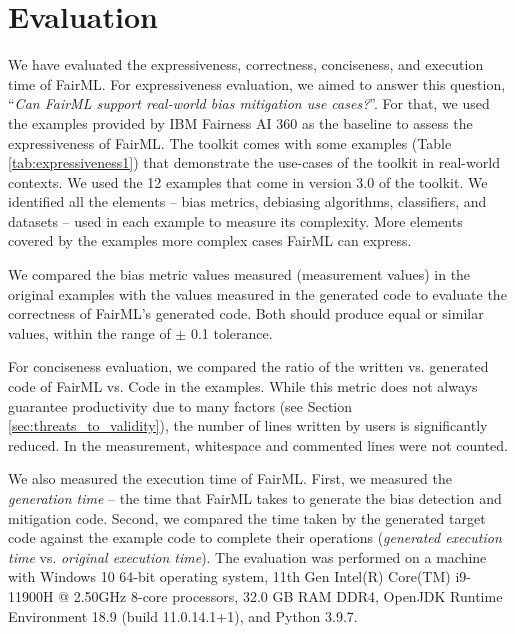 \documentclass[sigconf]{acmart}
\begin{document}
{	\section{Evaluation}
	\label{sec:evaluation}
	We have evaluated the expressiveness, correctness, conciseness, and execution time of FairML. For expressiveness evaluation, we aimed to answer this question, 
	``\textit{Can FairML support real-world bias mitigation use cases?}''. For that, we used the examples provided by IBM Fairness AI 360 as the baseline to assess the expressiveness of FairML. 
	The toolkit comes with some examples (Table \ref{tab:expressiveness1})
	that demonstrate 
	the use-cases of the toolkit in real-world contexts. 
	We used the 12 examples that come in version 3.0 of the toolkit.
	We identified all the elements -- bias metrics, debiasing algorithms, classifiers, and datasets -- used in each example to measure its complexity. More elements covered by the examples more complex cases FairML can express.
	
	We compared the bias metric values measured (measurement values) in the original examples with the values measured in the generated code to evaluate the correctness of FairML's generated code. Both should produce equal or similar values, within the range of $\pm$ 0.1 tolerance.
	
	For conciseness evaluation, 
	we compared the ratio of the written vs. generated code of FairML vs.
	Code in the examples. 
	While this metric does not always guarantee productivity due to many factors (see Section \ref{sec:threats_to_validity}), 
	the number of lines written by users is significantly reduced. In the measurement, whitespace and commented lines were not counted.
	
	We also measured the execution time of FairML. First, we measured the \textit{generation time} -- the time that FairML takes to generate the bias detection and mitigation code. Second, we compared the time taken by the generated target code against the example code to complete their operations (\textit{generated execution time} vs. \textit{original execution time}). The evaluation was performed on a machine with Windows 10 64-bit operating system, 11th Gen Intel(R) Core(TM) i9-11900H @ 2.50GHz 8-core processors, 32.0 GB RAM DDR4, OpenJDK Runtime Environment 18.9 (build 11.0.14.1+1), and Python 3.9.7.
	
}
\end{document}
